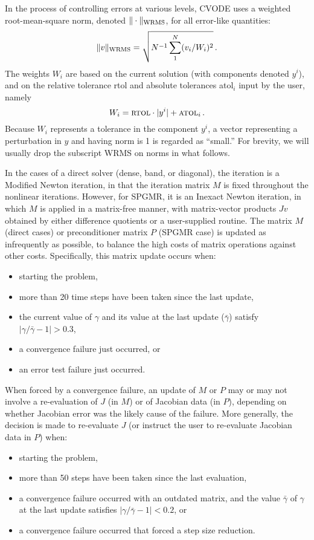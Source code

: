 In the process of controlling errors at various levels, CVODE uses a
weighted root-mean-square norm, denoted
$\|\cdot\|_{\mbox{\scriptsize WRMS}}$, for all
error-like quantities:
\begin{equation}\label{wrmsnorm}
 \|v\|_{\mbox{\scriptsize WRMS}} = \sqrt{N^{-1}\sum_1^N (v_i/W_i)^2}
 \, .
\end{equation}
The weights $W_i$ are based on the current solution (with components
denoted $y^i$), and on the relative tolerance {\sc rtol} and absolute
tolerances {\sc atol}$_i$ input by the user, namely
\begin{equation}\label{errwt}
 W_i = \mbox{\sc rtol} \cdot |y^i| + \mbox{\sc atol}_i \, .
\end{equation}
Because $W_i$ represents a tolerance in the component $y^i$, a vector
representing a perturbation in $y$ and having norm is 1 is regarded as
``small.''  For brevity, we will usually drop the subscript WRMS on
norms in what follows.

In the cases of a direct solver (dense, band, or diagonal), the
iteration is a Modified Newton iteration, in that the iteration matrix
$M$ is fixed throughout the nonlinear iterations.  However, for SPGMR,
it is an Inexact Newton iteration, in which $M$ is applied in a
matrix-free manner, with matrix-vector products $Jv$ obtained by
either difference quotients or a user-supplied routine.  The matrix
$M$ (direct cases) or preconditioner matrix $P$ (SPGMR case) is
updated as infrequently as possible, to balance the high costs of
matrix operations against other costs.  Specifically, this matrix
update occurs when:
\begin{itemize}
\item starting the problem,
\item more than 20 time steps have been taken since the last update,
\item the current value of $\gamma$ and its value at the last update
($\bar{\gamma}$) satisfy $|\gamma/\bar{\gamma} - 1| > 0.3$,
\item a convergence failure just occurred, or
\item an error test failure just occurred.
\end{itemize}
When forced by a convergence failure, an update of $M$ or $P$ may or
may not involve a re-evaluation of $J$ (in $M$) or of Jacobian data
(in $P$), depending on whether Jacobian error was the likely cause of
the failure.  More generally, the decision is made to re-evaluate $J$
(or instruct the user to re-evaluate Jacobian data in $P$) when:
\begin{itemize}
\item starting the problem,
\item more than 50 steps have been taken since the last evaluation,
\item a convergence failure occurred with an outdated matrix, and
the value $\bar{\gamma}$ of $\gamma$ at the last update
satisfies $|\gamma/\bar{\gamma} - 1| < 0.2$, or
\item a convergence failure occurred that forced a step size reduction.
\end{itemize}

